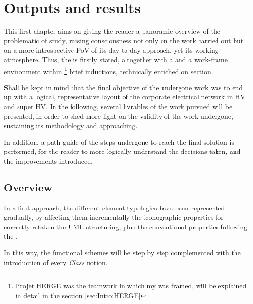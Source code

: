 \chapter{Outputs and results}
\label{cap:AIG:Outputs}
\begin{Resumen}

This first chapter aims on giving the reader a panoramic overview of the problematic of study, raising consciousness not only on the work carried out but on a more introspective PoV of its day-to-day approach, yet its working atmosphere. Thus, the  is firstly stated, altogether with a  and a work-frame environment within \footnote{Projet HERGE was the teamwork in which my  was framed, will be explained in detail in the section \ref{sec:Intro:HERGE}} brief inductions, technically enriched on   section.  

\end{Resumen}
\PartialToc


\bigskip
\lettrine[lines=2]{\textbf{S}}{}hall be kept in mind that the final objective of the undergone work was to end up with a logical, representative layout of the corporate electrical network in HV and super HV. In the following, several livrables of the work pursued will be presented, in order to shed more light on the validity of the work undergone, sustaining its methodology and approaching.

In addition, a path guide of the steps undergone to reach the final solution is performed, for the reader to more logically  understand the decisions taken, and the improvements introduced. 

\section{Overview}

In a first approach, the different element typologies have been represented gradually, by affecting them incrementally the iconographic properties for correctly retaken the UML structuring, plus the conventional properties following the .

In this way, the functional schemes will be step by step complemented with the introduction of every \textit{Class} notion.


